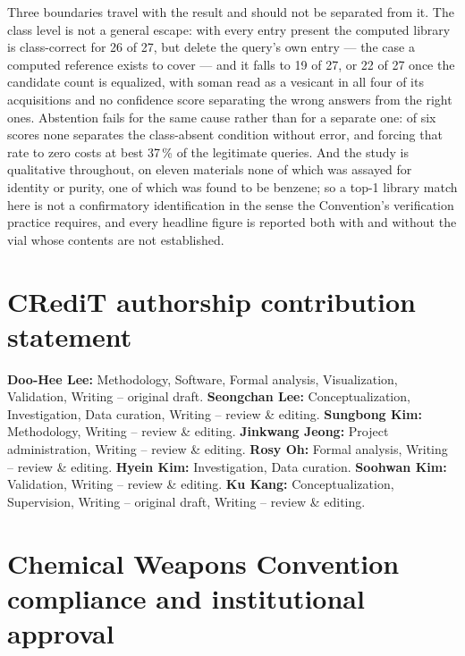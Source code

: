 \documentclass[review,12pt]{elsarticle}
\begin{document}
Three boundaries travel with the result and should not be separated from it. The class
level is not a general escape: with every entry present the computed library is
class-correct for 26 of 27, but delete the query's own entry --- the case a computed
reference exists to cover --- and it falls to 19 of 27, or 22 of 27 once the candidate
count is equalized, with soman read as a vesicant in all four of its acquisitions and no
confidence score separating the wrong answers from the right ones. Abstention fails for
the same cause rather than for a separate one: of six scores none separates the
class-absent condition without error, and forcing that rate to zero costs at best 37\,\%
of the legitimate queries. And the study is qualitative throughout, on eleven materials
none of which was assayed for identity or purity, one of which was found to be benzene; so
a top-1 library match here is not a confirmatory identification in the sense the
Convention's verification practice requires, and every headline figure is reported both
with and without the vial whose contents are not established.


\section*{CRediT authorship contribution statement}

\textbf{Doo-Hee Lee:} Methodology, Software, Formal analysis, Visualization, Validation,
Writing -- original draft.
\textbf{Seongchan Lee:} Conceptualization, Investigation, Data curation,
Writing -- review \& editing.
\textbf{Sungbong Kim:} Methodology, Writing -- review \& editing.
\textbf{Jinkwang Jeong:} Project administration, Writing -- review \& editing.
\textbf{Rosy Oh:} Formal analysis, Writing -- review \& editing.
\textbf{Hyein Kim:} Investigation, Data curation.
\textbf{Soohwan Kim:} Validation, Writing -- review \& editing.
\textbf{Ku Kang:} Conceptualization, Supervision, Writing -- original draft,
Writing -- review \& editing.

\section*{Chemical Weapons Convention compliance and institutional approval}
\end{document}
